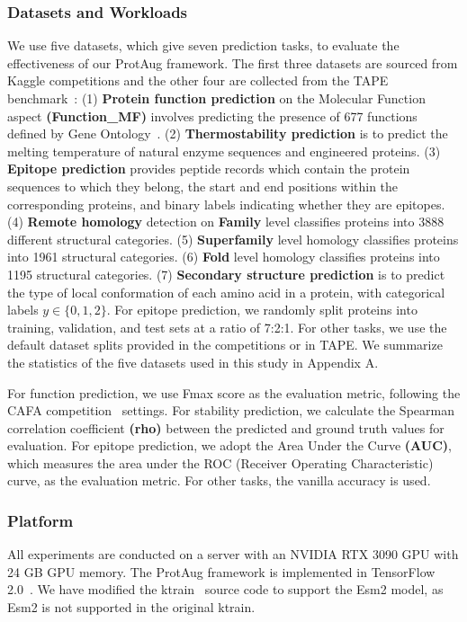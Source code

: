 \documentclass{article}
\begin{document}
\subsubsection{Datasets and Workloads}
We use five datasets, which give seven prediction tasks, to evaluate the effectiveness of our ProtAug framework. The first three datasets are sourced from Kaggle competitions and the other four are collected from the TAPE benchmark~\cite{rao2019TAPE}: (1) \textbf{Protein function prediction} on the Molecular Function aspect \textbf{(Function\_MF)} involves predicting the presence of 677 functions defined by Gene Ontology~\cite{gene2023go}. (2) \textbf{Thermostability prediction} is to predict the melting temperature of natural enzyme sequences and engineered proteins. (3) \textbf{Epitope prediction} provides peptide records which contain the protein sequences to which they belong, the start and end positions within the corresponding proteins, and binary labels indicating whether they are epitopes. (4) \textbf{Remote homology} detection on \textbf{Family} level classifies proteins into 3888 different structural categories. (5) \textbf{Superfamily} level homology classifies proteins into 1961 structural categories. (6) \textbf{Fold} level homology classifies proteins into 1195 structural categories. (7) \textbf{Secondary structure prediction} is to predict the type of local conformation of each amino acid in a protein, with categorical labels $y \in \{0, 1, 2\}$. For epitope prediction, we randomly split proteins into training, validation, and test sets at a ratio of 7:2:1. For other tasks, we use the default dataset splits provided in the competitions or in TAPE. We summarize the statistics of the five datasets used in this study in Appendix A.

For function prediction, we use Fmax score as the evaluation metric, following the CAFA competition~\cite{zhou2019cafa} settings. For stability prediction, we calculate the Spearman correlation coefficient \textbf{(rho)} between the predicted and ground truth values for evaluation. For epitope prediction, we adopt the Area Under the Curve \textbf{(AUC)}, which measures the area under the ROC (Receiver Operating Characteristic) curve, as the evaluation metric. For other tasks, the vanilla accuracy is used.

\subsubsection{Platform}
All experiments are conducted on a server with an NVIDIA RTX 3090 GPU with 24 GB GPU memory. The ProtAug framework is implemented in TensorFlow 2.0~\cite{abadi2016tensorflow}. We have modified the ktrain~\cite{maiya2020ktrain} source code to support the Esm2 model, as Esm2 is not supported in the original ktrain.
\end{document}
